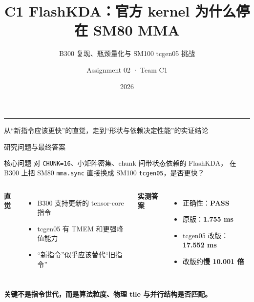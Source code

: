 \documentclass[aspectratio=169,10pt]{beamer}
\title{C1 FlashKDA：官方 kernel 为什么停在 SM80 MMA}
\subtitle{B300 复现、瓶颈量化与 SM100 tcgen05 挑战}
\author{Assignment 02 · Team C1}
\date{2026}
\newcommand{\good}[1]{\textcolor{KdaGreen}{\textbf{#1}}}
\newcommand{\bad}[1]{\textcolor{KdaRed}{\textbf{#1}}}
\newcommand{\key}[1]{\textcolor{KdaBlue}{\textbf{#1}}}
\newcommand{\code}[1]{\texttt{#1}}
\begin{document}
{
\begin{frame}[plain]
  \titlepage
  \vspace{-0.5em}
  \begin{center}
    \color{KdaCyan}\rule{0.62\paperwidth}{1.2pt}

    \vspace{0.7em}
    \color{white!82}\small
    从“新指令应该更快”的直觉，走到“形状与依赖决定性能”的实证结论
  \end{center}
\end{frame}
}

\begin{frame}{研究问题与最终答案}
  \begin{block}{核心问题}
    对 \code{CHUNK=16}、小矩阵密集、chunk 间带状态依赖的 FlashKDA，
    在 B300 上把 SM80 \code{mma.sync} 直接换成 SM100 \code{tcgen05}，是否更快？
  \end{block}

  \vspace{0.4em}
  \begin{columns}[T,onlytextwidth]
      \textbf{直觉}
      \begin{itemize}
        \item B300 支持更新的 tensor-core 指令
        \item tcgen05 有 TMEM 和更强峰值能力
        \item “新指令”似乎应该替代“旧指令”
      \end{itemize}
      \textbf{实测答案}
      \begin{itemize}
        \item 正确性：\good{PASS}
        \item 原版：\key{1.755 ms}
        \item tcgen05 改版：\bad{17.552 ms}
        \item 改版约\bad{慢 10.001 倍}
      \end{itemize}
  \end{columns}

  \vspace{0.3em}
  \centering
  \large\bfseries 关键不是指令世代，而是算法粒度、物理 tile 与并行结构是否匹配。

\end{frame}
\end{document}
